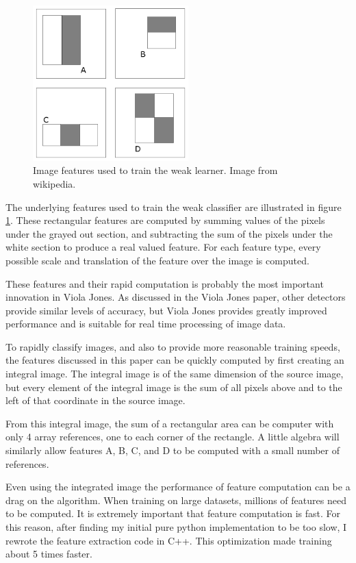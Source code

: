 \documentclass[11pt,twocolumn]{article}
\begin{document}
\begin{figure}
\includegraphics[width=60mm]{features.png}
\caption{Image features used to train the weak learner. Image from wikipedia.}
\label{fig:features}
\end{figure}

The underlying features used to train the weak classifier are
illustrated in figure \ref{fig:features}. These rectangular features
are computed by summing values of the pixels under the grayed out
section, and subtracting the sum of the pixels under the white section
to produce a real valued feature. For each feature type, every
possible scale and translation of the feature over the image is
computed.

These features and their rapid computation is probably the most
important innovation in Viola Jones. As discussed in the Viola Jones
paper\cite{violajones2001}, other detectors provide similar levels
of accuracy, but Viola Jones provides greatly improved performance and
is suitable for real time processing of image data.

To rapidly classify images, and also to provide more reasonable
training speeds, the features discussed in this paper can be quickly
computed by first creating an integral image. The integral image is of
the same dimension of the source image, but every element of the
integral image is the sum of all pixels above and to the left of that
coordinate in the source image.

From this integral image, the sum of a rectangular area can be
computer with only 4 array references, one to each corner of the
rectangle. A little algebra will similarly allow features A, B, C, and
D to be computed with a small number of references.

Even using the integrated image the performance of feature computation
can be a drag on the algorithm. When training on large datasets,
millions of features need to be computed. It is extremely important
that feature computation is fast. For this reason, after finding my
initial pure python implementation to be too slow, I rewrote the
feature extraction code in C++. This optimization made training about
5 times faster.
\end{document}
